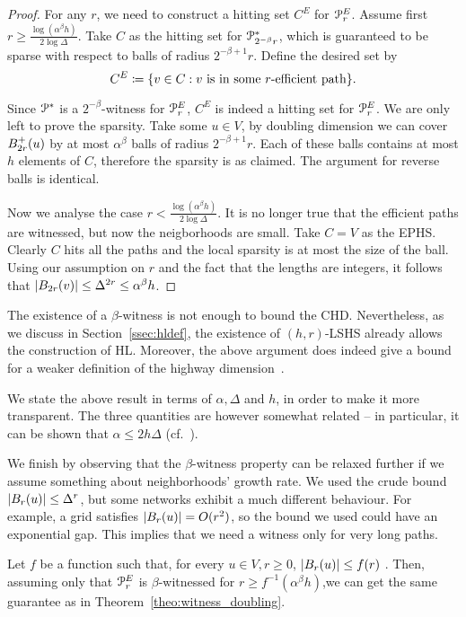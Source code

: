 \begin{proof}
For any $r$, we need to construct a hitting set $C^E$ for $\mathcal{P}^E_r$.
Assume first $r\geq \frac{\log(\alpha^\beta h)}{2\log\Delta}$.
Take $C$ as the hitting set for $\mathcal{P}^*_{2^{-\beta}r}$, which is guaranteed to be sparse with respect to balls of radius $2^{-\beta+1}r$.
Define the desired set by
\[
C^E\coloneqq\{v\in C: v \text{ is in some $r$-efficient path} \}.
\]

Since $\mathcal{P}^*$ is a $2^{-\beta}$-witness for $\mathcal{P}^E_r$, $C^E$ is indeed a hitting set for $\mathcal{P}^E_r$.
We are only left to prove the sparsity.
Take some $u\in V$, by doubling dimension we can cover $B^+_{2r}(u)$ by at most $\alpha^\beta$ balls of radius $2^{-\beta+1}r$.
Each of these balls contains at most $h$ elements of $C$, therefore the sparsity is as claimed.
The argument for reverse balls is identical.

Now we analyse the case $r< \frac{\log(\alpha^\beta h)}{2\log\Delta}$.
It is no longer true that the efficient paths are witnessed, but now the neigborhoods are small.
Take $C=V$ as the EPHS.
Clearly $C$ hits all the paths and the local sparsity is at most the size of the ball.
Using our assumption on $r$ and the fact that the lengths are integers, it follows that $\lvert B_{2r}(v)\rvert\leq\Delta^{2r}\leq\alpha^\beta h$. 
\end{proof}
\begin{remark}
The existence of a $\beta$-witness is not enough to bound the CHD. Nevertheless, as we discuss in Section~\ref{ssec:hldef}, the existence of $(h,r)$-LSHS already allows the construction of HL. Moreover, the above argument does indeed give a bound for a weaker definition of the highway dimension~\cite{highway2010}.
\end{remark}
\begin{remark}
We state the above result in terms of $\alpha, \Delta$ and $h$, in order to make it more transparent. The three quantities are however somewhat related -- in particular, it can be shown that $\alpha\leq 2h\Delta$ (cf.~\cite{skeleton}).
\end{remark}

We finish by observing that the $\beta$-witness property can be relaxed further if we assume something about neighborhoods' growth rate.
We used the crude bound $\lvert B_r(u)\rvert\leq \Delta^r$, but some networks exhibit a much different behaviour.
For example, a grid satisfies  $\lvert B_r(u)\rvert=O(r^2)$, so the bound we used could have an exponential gap.
This implies that we need a witness only for very long paths.

\begin{corollary}
Let $f$ be a function such that, for every $u\in V, r\geq 0$, $\lvert B_r(u)\rvert\leq f(r)$ .
Then, assuming only that $\mathcal{P}^E_r$ is $\beta$-witnessed for $r\geq f^{-1}(\alpha^\beta h)$,we can get the same guarantee as in Theorem~\ref{theo:witness_doubling}.
\end{corollary}
